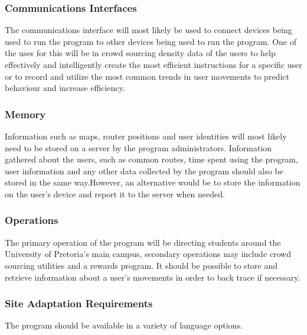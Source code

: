 \documentclass[a4paper,10pt]{article}
\begin{document}
		\subsubsection{Communications Interfaces}
			The communications interface will most likely be used to connect devices being used to run the program to				other devices being used to run the program. One of the uses for this will be in crowd sourcing density data of			the users to help effectively and intelligently create the most efficient instructions for a specific user or to		record and utilize the most common trends in user movements to predict behaviour and increase efficiency.
		\subsubsection{Memory}
			Information such as maps, router positions and user identities will most likely need to be stored on a server 			by the program administrators. Information gathered about the users, such as common routes, time spent using 				the program, user information and any other data collected by the program should also be stored in the same 				way.However, an alternative would be to store the information on the user's device and report it to the server 			when needed.   
		\subsubsection{Operations}
			The primary operation of the program will be directing students around the University of Pretoria's main				campus, secondary operations may include crowd sourcing utilities and a rewards program. It should be possible			to store and retrieve information about a user's movements in order to back trace if necessary.
		\subsubsection{Site Adaptation Requirements}
			The program should be available in a variety of language options.
		
\end{document}
